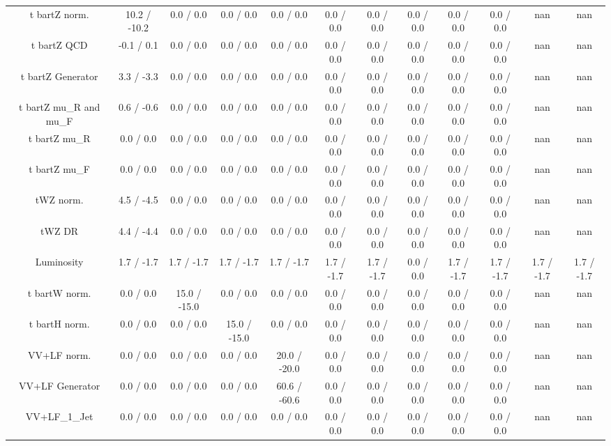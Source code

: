 \begin{table}[htbp]
\begin{center}
\begin{tabular}{|c|c|c|c|c|c|c|c|c|c|c|c|}
  t bar{t}Z norm. & 10.2 / -10.2 & 0.0 / 0.0 & 0.0 / 0.0 & 0.0 / 0.0 & 0.0 / 0.0 & 0.0 / 0.0 & 0.0 / 0.0 & 0.0 / 0.0 & 0.0 / 0.0 &    nan    &    nan    \\ 
  t bar{t}Z QCD & -0.1 / 0.1 & 0.0 / 0.0 & 0.0 / 0.0 & 0.0 / 0.0 & 0.0 / 0.0 & 0.0 / 0.0 & 0.0 / 0.0 & 0.0 / 0.0 & 0.0 / 0.0 &    nan    &    nan    \\ 
  t bar{t}Z Generator & 3.3 / -3.3 & 0.0 / 0.0 & 0.0 / 0.0 & 0.0 / 0.0 & 0.0 / 0.0 & 0.0 / 0.0 & 0.0 / 0.0 & 0.0 / 0.0 & 0.0 / 0.0 &    nan    &    nan    \\ 
  t bar{t}Z  mu_{R} and  mu_{F} & 0.6 / -0.6 & 0.0 / 0.0 & 0.0 / 0.0 & 0.0 / 0.0 & 0.0 / 0.0 & 0.0 / 0.0 & 0.0 / 0.0 & 0.0 / 0.0 & 0.0 / 0.0 &    nan    &    nan    \\ 
  t bar{t}Z  mu_{R} & 0.0 / 0.0 & 0.0 / 0.0 & 0.0 / 0.0 & 0.0 / 0.0 & 0.0 / 0.0 & 0.0 / 0.0 & 0.0 / 0.0 & 0.0 / 0.0 & 0.0 / 0.0 &    nan    &    nan    \\ 
  t bar{t}Z  mu_{F} & 0.0 / 0.0 & 0.0 / 0.0 & 0.0 / 0.0 & 0.0 / 0.0 & 0.0 / 0.0 & 0.0 / 0.0 & 0.0 / 0.0 & 0.0 / 0.0 & 0.0 / 0.0 &    nan    &    nan    \\ 
  tWZ norm. & 4.5 / -4.5 & 0.0 / 0.0 & 0.0 / 0.0 & 0.0 / 0.0 & 0.0 / 0.0 & 0.0 / 0.0 & 0.0 / 0.0 & 0.0 / 0.0 & 0.0 / 0.0 &    nan    &    nan    \\ 
  tWZ DR & 4.4 / -4.4 & 0.0 / 0.0 & 0.0 / 0.0 & 0.0 / 0.0 & 0.0 / 0.0 & 0.0 / 0.0 & 0.0 / 0.0 & 0.0 / 0.0 & 0.0 / 0.0 &    nan    &    nan    \\ 
  Luminosity & 1.7 / -1.7 & 1.7 / -1.7 & 1.7 / -1.7 & 1.7 / -1.7 & 1.7 / -1.7 & 1.7 / -1.7 & 0.0 / 0.0 & 1.7 / -1.7 & 1.7 / -1.7 & 1.7 / -1.7 & 1.7 / -1.7 \\ 
  t bar{t}W norm. & 0.0 / 0.0 & 15.0 / -15.0 & 0.0 / 0.0 & 0.0 / 0.0 & 0.0 / 0.0 & 0.0 / 0.0 & 0.0 / 0.0 & 0.0 / 0.0 & 0.0 / 0.0 &    nan    &    nan    \\ 
  t bar{t}H norm. & 0.0 / 0.0 & 0.0 / 0.0 & 15.0 / -15.0 & 0.0 / 0.0 & 0.0 / 0.0 & 0.0 / 0.0 & 0.0 / 0.0 & 0.0 / 0.0 & 0.0 / 0.0 &    nan    &    nan    \\ 
  VV+LF norm. & 0.0 / 0.0 & 0.0 / 0.0 & 0.0 / 0.0 & 20.0 / -20.0 & 0.0 / 0.0 & 0.0 / 0.0 & 0.0 / 0.0 & 0.0 / 0.0 & 0.0 / 0.0 &    nan    &    nan    \\ 
  VV+LF Generator & 0.0 / 0.0 & 0.0 / 0.0 & 0.0 / 0.0 & 60.6 / -60.6 & 0.0 / 0.0 & 0.0 / 0.0 & 0.0 / 0.0 & 0.0 / 0.0 & 0.0 / 0.0 &    nan    &    nan    \\ 
  VV+LF_1_Jet & 0.0 / 0.0 & 0.0 / 0.0 & 0.0 / 0.0 & 0.0 / 0.0 & 0.0 / 0.0 & 0.0 / 0.0 & 0.0 / 0.0 & 0.0 / 0.0 & 0.0 / 0.0 &    nan    &    nan    \\ 

\end{tabular}
\end{center}
\end{table}
